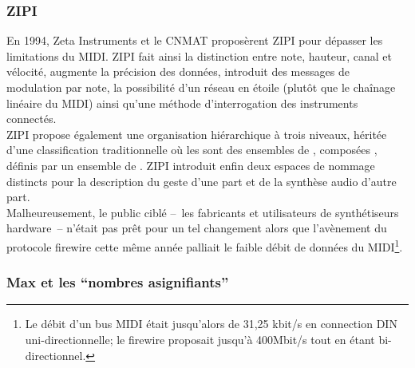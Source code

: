 \subsubsection{ZIPI}

\noindent En 1994, Zeta Instruments et le \gls{CNMAT} proposèrent \gls{ZIPI}\cite{mcmillen_zipi_1994} pour dépasser les limitations du \gls{MIDI}. \gls{ZIPI} fait ainsi la distinction entre note, hauteur, canal et vélocité, augmente la précision des données, introduit des messages de modulation par note, la possibilité d'un réseau en étoile (plutôt que le chaînage linéaire du \gls{MIDI}) ainsi qu'une méthode d'interrogation des instruments connectés.\\
\indent \gls{ZIPI} propose également une organisation hiérarchique à trois niveaux, héritée d'une classification traditionnelle où les  sont des ensembles de , composées , définis par un ensemble de . \gls{ZIPI} introduit enfin deux espaces de nommage distincts pour la description du geste d'une part et de la synthèse audio d'autre part.\\
\indent Malheureusement, le public ciblé --~les fabricants et utilisateurs de synthétiseurs hardware~-- n'était pas prêt pour un tel changement alors que l'avènement du protocole \gls{firewire} cette même année palliait le faible débit de données du \gls{MIDI}\footnote{ Le débit d'un bus \gls{MIDI} était jusqu'alors de 31,25 kbit/s en connection DIN uni-directionnelle; le \gls{firewire} proposait jusqu'à 400Mbit/s tout en étant bi-directionnel.}.

\subsubsection{Max et les ``nombres asignifiants''}

